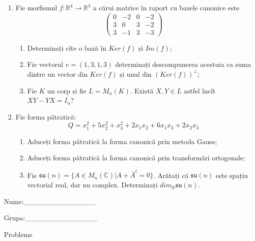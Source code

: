 \documentclass{article}
\begin{document}
\begin{enumerate}
 \item Fie morfismul $f:\mathbb{R}^4 \to \mathbb{R}^3$ a cărui matrice în raport cu bazele canonice este
$$\begin{pmatrix}
0&-2&0&-2\\
3&0&3&-2\\
3&-1&3&-3
\end{pmatrix}$$

\begin{enumerate}
\item Determinați cîte o bază în $Ker(f)$ și $Im(f)$;
\item Fie vectorul $v=(1,3,1,3)$ determinați descompunerea acestuia ca suma dintre un vector din $Ker(f)$ și unul din $(Ker(f))^\perp$;
\item Fie $K$ un corp și fie $L=M_n(K)$. Există $X,Y \in L$ astfel încît $XY-YX=I_n$?  
\end{enumerate}
\item Fie forma pătratică:
$$Q= x_1^2+5x_2^2+x_3^2+2x_1x_2+6x_1x_3+2x_2x_3$$

\begin{enumerate}
\item Aduceți forma pătratică la forma canonică prin metoda Gauss;
\item Aduceți forma pătratică la forma canonică prin transformări ortogonale;
\item Fie $\mathfrak{su}(n)=\{ A \in M_n(\mathbb{C}) | A+\bar{A}^t=0\}$. Arătați că $\mathfrak{su}(n)$ este spațiu vectorial real, dar nu complex.
Determinați $dim_{\mathbb{R}}\mathfrak{su}(n)$.
\end{enumerate}
\end{enumerate}
\newpage
\begin{flushright}
Nume:\_\_\_\_\_\_\_\_\_\_\_\_\_\_
 
 
Grupa:\_\_\_\_\_\_\_\_\_\_\_\_\_\_
\end{flushright}
\begin{center}
\vspace{2cm}
{\Large Probleme}
\vspace{2cm}
\end{center}
\end{document}
